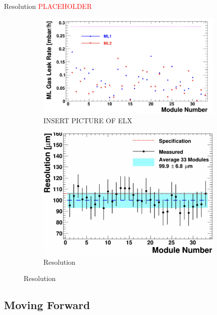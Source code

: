 \documentclass{beamer}
\def\ph{\textcolor{red}{PLACEHOLDER}}
\begin{document}
		\begin{frame}{Resolution \ph}
			\begin{figure}
				\centering	
				\begin{subfigure}[c]{0.4\pdfpagewidth}
					\includegraphics[width=0.3\pdfpagewidth]{ChamberLeakRate.png}
					\caption{INSERT PICTURE OF ELX}
				\end{subfigure}
				\hfill
				\begin{subfigure}[c]{0.4\pdfpagewidth}
					\includegraphics[width=0.4\pdfpagewidth]{ChamberResolution.png}
					\caption{Resolution}
					\label{fig:ChamberResolution}
				\end{subfigure}
			\end{figure}
			
		\end{frame}



	\subsection{Moving Forward}
\end{document}
